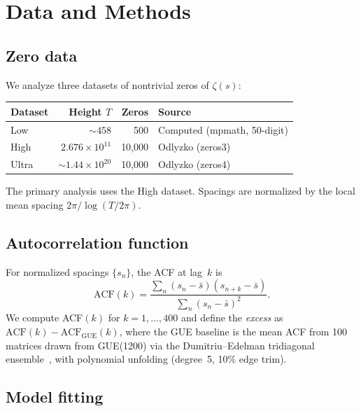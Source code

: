 \documentclass[11pt,a4paper]{article}
\begin{document}
\section{Data and Methods}

\subsection{Zero data}

We analyze three datasets of nontrivial zeros of $\zeta(s)$:

\begin{table}[ht]
\centering
\begin{tabular}{@{}lrrl@{}}
\toprule
Dataset & Height $T$ & Zeros & Source \\
\midrule
Low   & $\sim 458$                  & 500    & Computed (mpmath, 50-digit) \\
High  & $2.676 \times 10^{11}$      & 10{,}000 & Odlyzko (zeros3) \\
Ultra & $\sim 1.44 \times 10^{20}$  & 10{,}000 & Odlyzko (zeros4) \\
\bottomrule
\end{tabular}
\end{table}

The primary analysis uses the High dataset.
Spacings are normalized by the local mean spacing $2\pi/\log(T/2\pi)$.

\subsection{Autocorrelation function}

For normalized spacings $\{s_n\}$, the ACF at lag~$k$ is
\begin{equation}
\mathrm{ACF}(k) = \frac{\sum_n (s_n - \bar{s})(s_{n+k} - \bar{s})}{\sum_n (s_n - \bar{s})^2}.
\end{equation}
We compute ACF$(k)$ for $k = 1, \ldots, 400$ and define the \emph{excess} as $\mathrm{ACF}(k) - \mathrm{ACF}_{\mathrm{GUE}}(k)$, where the GUE baseline is the mean ACF from 100 matrices drawn from GUE(1200) via the Dumitriu--Edelman tridiagonal ensemble~\cite{DumiEdel2002}, with polynomial unfolding (degree~5, 10\% edge trim).

\subsection{Model fitting}
\end{document}

